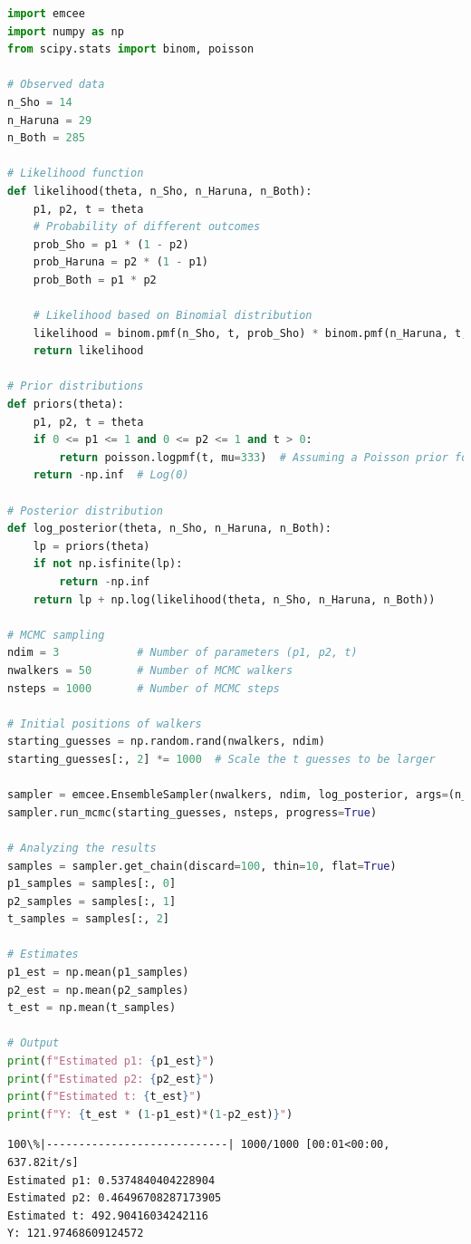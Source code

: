 \documentclass[12pt]{article}
\begin{document}
\newpage
\begin{lstlisting}[language=Python]
import emcee
import numpy as np
from scipy.stats import binom, poisson

# Observed data
n_Sho = 14
n_Haruna = 29
n_Both = 285

# Likelihood function
def likelihood(theta, n_Sho, n_Haruna, n_Both):
    p1, p2, t = theta
    # Probability of different outcomes
    prob_Sho = p1 * (1 - p2)
    prob_Haruna = p2 * (1 - p1)
    prob_Both = p1 * p2

    # Likelihood based on Binomial distribution
    likelihood = binom.pmf(n_Sho, t, prob_Sho) * binom.pmf(n_Haruna, t, prob_Haruna) * binom.pmf(n_Both, t, prob_Both)
    return likelihood

# Prior distributions
def priors(theta):
    p1, p2, t = theta
    if 0 <= p1 <= 1 and 0 <= p2 <= 1 and t > 0:
        return poisson.logpmf(t, mu=333)  # Assuming a Poisson prior for t with a mean of 333
    return -np.inf  # Log(0)

# Posterior distribution
def log_posterior(theta, n_Sho, n_Haruna, n_Both):
    lp = priors(theta)
    if not np.isfinite(lp):
        return -np.inf
    return lp + np.log(likelihood(theta, n_Sho, n_Haruna, n_Both))

# MCMC sampling
ndim = 3            # Number of parameters (p1, p2, t)
nwalkers = 50       # Number of MCMC walkers
nsteps = 1000       # Number of MCMC steps

# Initial positions of walkers
starting_guesses = np.random.rand(nwalkers, ndim)
starting_guesses[:, 2] *= 1000  # Scale the t guesses to be larger

sampler = emcee.EnsembleSampler(nwalkers, ndim, log_posterior, args=(n_Sho, n_Haruna, n_Both))
sampler.run_mcmc(starting_guesses, nsteps, progress=True)

# Analyzing the results
samples = sampler.get_chain(discard=100, thin=10, flat=True)
p1_samples = samples[:, 0]
p2_samples = samples[:, 1]
t_samples = samples[:, 2]

# Estimates
p1_est = np.mean(p1_samples)
p2_est = np.mean(p2_samples)
t_est = np.mean(t_samples)

# Output
print(f"Estimated p1: {p1_est}")
print(f"Estimated p2: {p2_est}")
print(f"Estimated t: {t_est}")
print(f"Y: {t_est * (1-p1_est)*(1-p2_est)}")
\end{lstlisting}

\begin{verbatim}
100\%|----------------------------| 1000/1000 [00:01<00:00, 637.82it/s]
Estimated p1: 0.5374840404228904
Estimated p2: 0.46496708287173905
Estimated t: 492.90416034242116
Y: 121.97468609124572
\end{verbatim}
\end{document}

